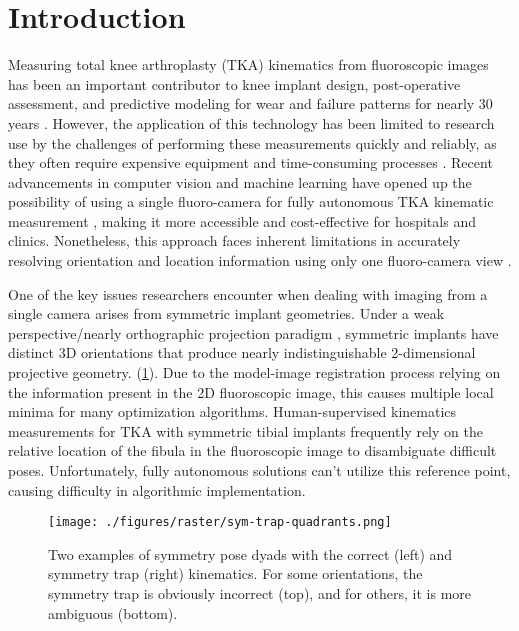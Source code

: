 \section{Introduction}
Measuring total knee arthroplasty (TKA) kinematics from fluoroscopic images has been an important contributor to knee implant design, post-operative assessment, and predictive modeling for wear and failure patterns for nearly 30 years \cite{banksRationaleResultsFixedBearing2019,banks2003HapPaul2004,freglyComputationalWearPrediction2005}.
However, the application of this technology has been limited to research use by the challenges of performing these measurements quickly and reliably, as they often require expensive equipment and time-consuming processes \cite{banksAccurateMeasurementThreedimensional1996,lafortuneThreedimensionalKinematicsHuman1992,zuffiModelbasedMethodReconstruction1999,mahfouzRobustMethodRegistration2003}.
Recent advancements in computer vision and machine learning have opened up the possibility of using a single fluoro-camera for fully autonomous TKA kinematic measurement \cite{brobergValidationMachineLearning2023,jensenJointTrackMachine2023}, making it more accessible and cost-effective for hospitals and clinics.
Nonetheless, this approach faces inherent limitations in accurately resolving orientation and location information using only one fluoro-camera view \cite{banksAccurateMeasurementThreedimensional1996,floodAutomatedRegistration3D2018,mahfouzRobustMethodRegistration2003,yamazakiImprovementDepthPosition2004,zuffiModelbasedMethodReconstruction1999}.

One of the key issues researchers encounter when dealing with imaging from a single camera arises from symmetric implant geometries.
Under a weak perspective/nearly orthographic projection paradigm \cite{szeliskiComputerVisionAlgorithms2022}, symmetric implants have distinct 3D orientations that produce nearly indistinguishable 2-dimensional projective geometry.  (\cref{fig:symmetry-trap-quadrants}).
Due to the model-image registration process relying on the information present in the 2D fluoroscopic image, this causes multiple local minima for many optimization algorithms.
Human-supervised kinematics measurements for TKA with symmetric tibial implants frequently rely on the relative location of the fibula in the fluoroscopic image to disambiguate difficult poses.
Unfortunately, fully autonomous solutions can’t utilize this reference point, causing difficulty in algorithmic implementation.

\begin{figure}[h!]
  \centering
  \texttt{[image: ./figures/raster/sym-trap-quadrants.png]}
  \caption{Two examples of symmetry pose dyads with the correct (left) and symmetry trap (right) kinematics. For some orientations, the symmetry trap is obviously incorrect (top), and for others, it is more ambiguous (bottom).}
  \label{fig:symmetry-trap-quadrants}
\end{figure}


